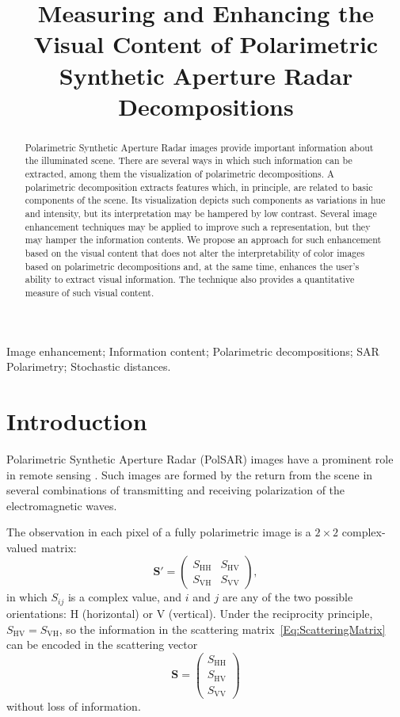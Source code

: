 \documentclass{article}
\title{Measuring and Enhancing the Visual Content of Polarimetric Synthetic Aperture Radar Decompositions}
\begin{document}
%
\maketitle
%
\begin{abstract}
Polarimetric Synthetic Aperture Radar images provide important information about the illuminated scene.
There are several ways in which such information can be extracted, among them the visualization of polarimetric decompositions.
A polarimetric decomposition extracts features which, in principle, are related to basic components of the scene.
Its visualization depicts such components as variations in hue and intensity, but its interpretation may be hampered by low contrast.
Several image enhancement techniques may be applied to improve such a representation, but they may hamper the information contents.
We propose an approach for such enhancement based on the visual content that does not alter the interpretability of color images based on polarimetric decompositions and, at the same time, enhances the user's ability to extract visual information.
The technique also provides a quantitative measure of such visual content.
\end{abstract}
%
\begin{keywords}
Image enhancement;
Information content;
Polarimetric decompositions;
SAR Polarimetry;
Stochastic distances.
\end{keywords}
%
\section{Introduction}
\label{sec:intro}

Polarimetric Synthetic Aperture Radar (PolSAR) images have a prominent role in remote sensing \citep{PolarisationApplicationsRemoteSensing,LeePottier2009PolarimetricRadarImaging}.
Such images are formed by the return from the scene in several combinations of transmitting and receiving polarization of the electromagnetic waves.

The observation in each pixel of a fully polarimetric image is a $2\times2$ complex-valued matrix:
\begin{equation}
\bm S' = \begin{pmatrix}
   	S_{\text{HH}} & S_{\text{HV}}\\
   	S_{\text{VH}} & S_{\text{VV}}
\end{pmatrix}, \label{Eq:ScatteringMatrix}
\end{equation}
in which $S_{ij}$ is a complex value, and $i$ and $j$ are any of the two possible orientations: $\text{H}$ (horizontal) or $\text{V}$ (vertical).
Under the reciprocity principle, $S_{\text{HV}}=S_{\text{VH}}$, so the information in the scattering matrix~\eqref{Eq:ScatteringMatrix} can be encoded in the scattering vector
\begin{equation}
\bm S = \begin{pmatrix}
   	S_{\text{HH}}\\
   	S_{\text{HV}}\\
   	S_{\text{VV}}
\end{pmatrix}
\end{equation}
without loss of information.
\end{document}
